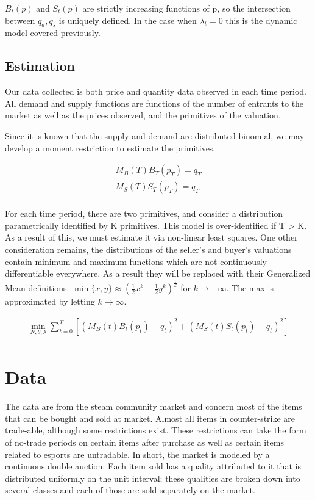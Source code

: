 \documentclass[12pt, letterpaper]{paper}
\begin{document}
$B_t(p)$ and $S_t(p)$ are strictly increasing functions of p, so the
intersection between $q_d, q_s$ is uniquely defined. In the case when
$\lambda_t = 0$ this is the dynamic model covered previously.

\subsection{Estimation}
\label{sec-2-6}

Our data collected is both price and quantity data observed in
each time period. All demand and supply functions are functions of
the number of entrants to the market as well as the prices observed,
and the primitives of the valuation. 

Since it is known that the supply and demand are distributed binomial,
we may develop a moment restriction to estimate the primitives.

\begin{align*}
M_B(T) B_T (p_T ) = q_T \\
M_S(T) S_T (p_T ) = q_T \\
\end{align*}

For each time period, there are two primitives, and consider a
distribution parametrically identified by K primitives. This model is
over-identified if T > K. As a result of this, we must estimate it via
non-linear least squares. One other consideration remains, the
distributions of the seller's and buyer's valuations contain minimum
and maximum functions which are not continuously differentiable
everywhere. As a result they will be replaced with their Generalized
Mean definitions: $\min \{ x, y \} \approx \left (
\frac{1}{2} x^k + \frac{1}{2}y^k \right )^{\frac{1}{k}}$ for $k \to - \infty$. The
max is approximated by letting $k \to \infty$.

\begin{align*}
\min_{N,\theta,\lambda} \sum_{t=0}^T \left [ \left ( M_B(t) B_t (p_t ) - q_t \right )^2 + \left (
M_S(t) S_t(p_t) - q_t \right )^2 \right ]\\
\end{align*}

\nocite{Efficiency}
\nocite{DoubleAuc}
\nocite{LimeBoy}
\nocite{PriceDataOnly}
\nocite{LitReview}
\nocite{Liquidpedia}
\nocite{SteamMarket}
\nocite{NonAtomic}
\nocite{StructuralEconometrics}


\section{Data}
\label{sec-3}
The data are from the steam community market and concern most of the items
that can be bought and sold at market. Almost all items in
counter-strike are trade-able, although some restrictions exist. These
restrictions can take the form of no-trade periods on certain items
after purchase as well as certain items related to esports are
untradable. In short, the market is modeled by a continuous double
auction. Each item sold has a quality attributed to it that is
distributed uniformly on the unit interval; these qualities are broken
down into several classes and each of those are sold separately on the
market.
\end{document}
